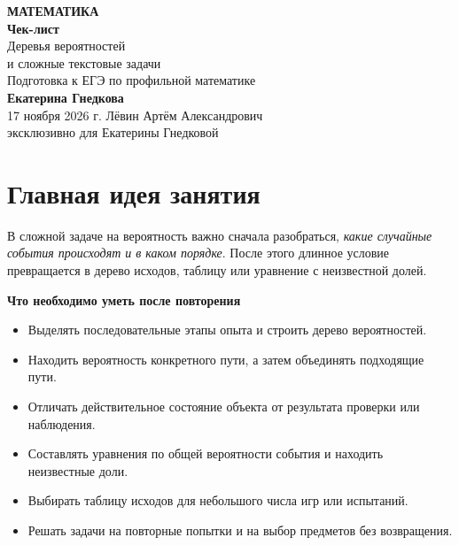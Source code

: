 \documentclass[a4paper,12pt]{article}
\newcommand{\smalltopic}[1]{\par\vspace{7pt}\noindent\textcolor{darkaccent}{\bfseries #1}\par\vspace{1pt}}
\begin{document}
\begin{titlepage}
\thispagestyle{empty}
\begin{center}
\vspace*{26mm}
{\large\bfseries\textcolor{darkaccent}{МАТЕМАТИКА}}\\[19mm]
{\fontsize{30}{36}\selectfont\bfseries Чек-лист}\\[8mm]
{\fontsize{18}{24}\selectfont Деревья вероятностей\\[-1mm]и сложные текстовые задачи}\\[13mm]
{\large Подготовка к ЕГЭ по профильной математике}\\[29mm]
{\Large\bfseries Екатерина Гнедкова}\\[12mm]
{\large 17 ноября 2026 г.}
\vfill
{\normalsize Лёвин Артём Александрович}\\[1.5mm]
{\small эксклюзивно для Екатерины Гнедковой}\\[13mm]
\end{center}
\end{titlepage}

\section*{Главная идея занятия}
В сложной задаче на вероятность важно сначала разобраться, \emph{какие случайные события происходят и в каком порядке}. После этого длинное условие превращается в дерево исходов, таблицу или уравнение с неизвестной долей.

\smalltopic{Что необходимо уметь после повторения}
\begin{itemize}
\item Выделять последовательные этапы опыта и строить дерево вероятностей.
\item Находить вероятность конкретного пути, а затем объединять подходящие пути.
\item Отличать действительное состояние объекта от результата проверки или наблюдения.
\item Составлять уравнения по общей вероятности события и находить неизвестные доли.
\item Выбирать таблицу исходов для небольшого числа игр или испытаний.
\item Решать задачи на повторные попытки и на выбор предметов без возвращения.
\end{itemize}
\end{document}
